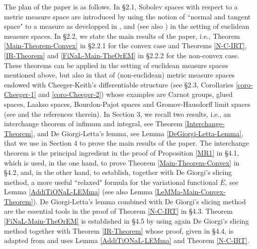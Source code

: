\documentclass[10pt]{amsart}
\numberwithin{equation}{section}
\theoremstyle{definition}
\theoremstyle{remark}
\begin{document}
The plan of the paper is as follows. In \S 2.1, Sobolev spaces with respect to a metric measure space are introduced by using the notion of ``normal and tangent space" to a measure as developped in \cite[\S 2]{boubusep97}, \cite[\S 7]{oah-jpm03} and \cite[\S 2]{jpm05} (see also \cite{zhikov96,zhikov00}) in the setting of euclidean measure spaces. In \S 2.2, we state the main results of the paper, i.e., Theorem \ref{Main-Theorem-Convex} in \S 2.2.1 for the convex case and Theorems \ref{N-C-IRT}, \ref{IR-Theorem} and \ref{FiNaL-Main-TheOrEM} in \S 2.2.2 for the non-convex case. These theorems can be applied in the setting of euclidean measure spaces mentioned above, but also in that of (non-euclidean) metric measure spaces endowed with Cheeger-Keith's differentiable structure (see \S 2.3, Corollaries \ref{coro-Cheeger-1} and \ref{coro-Cheeger-2}) whose examples are Carnot groups, glued spaces, Laakso spaces, Bourdon-Pajot spaces and Gromov-Hausdorff limit spaces (see \cite{cheeger99, hajlaszkoskela00, gromov07} and the references therein). In Section 3, we recall two results, i.e., an interchange theorem of infimum and integral, see Theorem \ref{Interchange-Theorem}, and De Giorgi-Letta's lemma, see Lemma \ref{DeGiorgi-Letta-Lemma}, that we use in Section 4 to prove the main results of the paper. The interchange theorem is the principal ingredient in the proof of Proposition \ref{MR1} in \S 4.1, which is used, in the one hand,  to prove Theorem \ref{Main-Theorem-Convex} in \S 4.2, and, in the other hand, to establish, together with De Giorgi's slicing method, a more useful ``relaxed" formula for the variational functional $\overline{E}$, see Lemma \ref{AddiTiONaL-LEMma} (see also Lemma \ref{LeMMa-Main-Convex-Theorem}). De Giorgi-Letta's lemma combined with De Giorgi's slicing method are the essential tools in the proof of Theorem \ref{N-C-IRT} in \S 4.3. Theorem \ref{FiNaL-Main-TheOrEM} is established in \S 4.5 by using again De Giorgi's slicing method together with Theorem \ref{IR-Theorem} whose proof, given in \S4.4, is adapted from \cite[Lemmas 3.3 and 3.5]{boufonmas98} and uses Lemma \ref{AddiTiONaL-LEMma} and Theorem \ref{N-C-IRT}.

\medskip
\end{document}
